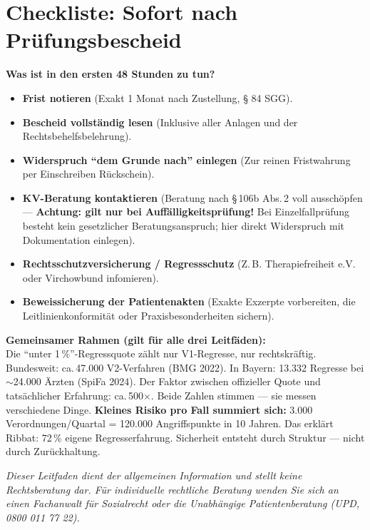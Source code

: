 \documentclass[a4paper]{umbruch-position}
\begin{document}
\newpage
\section{Checkliste: Sofort nach Pr\"ufungsbescheid}

\begin{center}
\textbf{Was ist in den ersten 48 Stunden zu tun?}
\end{center}

\begin{itemize}
    \item[$\square$] \textbf{Frist notieren} (Exakt 1 Monat nach Zustellung, § 84 SGG).
    \item[$\square$] \textbf{Bescheid vollst\"andig lesen} (Inklusive aller Anlagen und der Rechtsbehelfsbelehrung).
    \item[$\square$] \textbf{Widerspruch ``dem Grunde nach'' einlegen} (Zur reinen Fristwahrung per Einschreiben R\"uckschein).
    \item[$\square$] \textbf{KV-Beratung kontaktieren} (Beratung nach \S\,106b Abs.\,2 voll aussch\"opfen --- \textbf{Achtung: gilt nur bei Auff\"alligkeitspr\"ufung!} Bei Einzelfallpr\"ufung besteht kein gesetzlicher Beratungsanspruch; hier direkt Widerspruch mit Dokumentation einlegen).
    \item[$\square$] \textbf{Rechtsschutzversicherung / Regressschutz} (Z.\,B. Therapiefreiheit e.V. oder Virchowbund infomieren).
    \item[$\square$] \textbf{Beweissicherung der Patientenakten} (Exakte Exzerpte vorbereiten, die Leitlinienkonformit\"at oder Praxisbesonderheiten sichern).
\end{itemize}

\vspace{1cm}

\begin{infobox}
\textbf{Gemeinsamer Rahmen (gilt f\"ur alle drei Leitf\"aden):}\\
Die ``unter 1\,\%''-Regressquote z\"ahlt nur V1-Regresse, nur rechtskr\"aftig. Bundesweit: ca.\,47.000 V2-Verfahren (BMG 2022). In Bayern: 13.332 Regresse bei $\sim$24.000 \"Arzten (SpiFa 2024). Der Faktor zwischen offizieller Quote und tats\"achlicher Erfahrung: ca.\,500$\times$. Beide Zahlen stimmen --- sie messen verschiedene Dinge. \textbf{Kleines Risiko pro Fall summiert sich:} 3.000 Verordnungen/Quartal = 120.000 Angriffspunkte in 10 Jahren. Das erkl\"art Ribbat: 72\,\% eigene Regresserfahrung. Sicherheit entsteht durch Struktur --- nicht durch Zur\"uckhaltung.
\end{infobox}

\vfill
\begin{center}
\footnotesize{\textit{Dieser Leitfaden dient der allgemeinen Information und stellt keine Rechtsberatung dar. F\"ur individuelle rechtliche Beratung wenden Sie sich an einen Fachanwalt f\"ur Sozialrecht oder die Unabh\"angige Patientenberatung (UPD, 0800 011 77 22).}}
\end{center}
\end{document}
